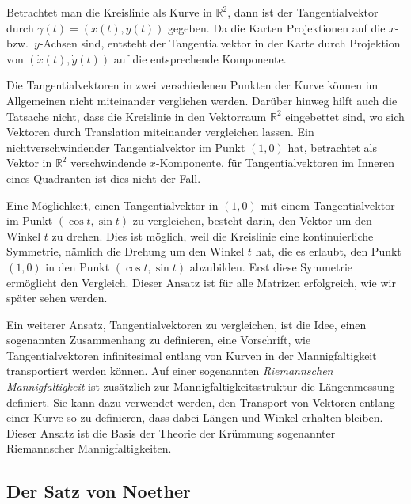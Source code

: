 Betrachtet man die Kreislinie als Kurve in $\mathbb{R}^2$,
dann ist der Tangentialvektor durch
$\dot{\gamma}(t)=(\dot{x}(t),\dot{y}(t))$ gegeben.
Da die Karten Projektionen auf die $x$- bzw.~$y$-Achsen sind,
entsteht der Tangentialvektor in der Karte durch Projektion
von $(\dot{x}(t),\dot{y}(t))$ auf die entsprechende Komponente.

Die Tangentialvektoren in zwei verschiedenen Punkten der Kurve können
im Allgemeinen nicht miteinander verglichen werden.
Darüber hinweg hilft auch die Tatsache nicht, dass die Kreislinie
in den Vektorraum $\mathbb{R}^2$ eingebettet sind, wo sich Vektoren
durch Translation miteinander vergleichen lassen.
Ein nichtverschwindender Tangentialvektor im Punkt $(1,0)$ hat, 
betrachtet als Vektor in $\mathbb{R}^2$ verschwindende $x$-Komponente,
für Tangentialvektoren im Inneren eines Quadranten ist dies nicht
der Fall.

Eine Möglichkeit, einen Tangentialvektor in $(1,0)$ mit einem
Tangentialvektor im Punkt $(\cos t,\sin t)$ zu vergleichen, besteht
darin, den Vektor um den Winkel $t$ zu drehen.
Dies ist möglich, weil die Kreislinie eine kontinuierliche Symmetrie,
nämlich die Drehung um den Winkel $t$ hat, die es erlaubt, den Punkt $(1,0)$
in den Punkt $(\cos t,\sin t)$ abzubilden.
Erst diese Symmetrie ermöglicht den Vergleich.
Dieser Ansatz ist für alle Matrizen erfolgreich, wie wir später sehen werden.

Ein weiterer Ansatz, Tangentialvektoren zu vergleichen, ist die Idee, 
einen sogenannten Zusammenhang zu definieren, eine Vorschrift, wie
Tangentialvektoren infinitesimal entlang von Kurven in der Mannigfaltigkeit
transportiert werden können.
Auf einer sogenannten {\em Riemannschen Mannigfaltigkeit} ist zusätzlich
zur Mannigfaltigkeitsstruktur die Längenmessung definiert.
Sie kann dazu verwendet werden, den Transport von Vektoren entlang einer
Kurve so zu definieren, dass dabei Längen und Winkel erhalten bleiben.
Dieser Ansatz ist die Basis der Theorie der Krümmung sogenannter
Riemannscher Mannigfaltigkeiten.

\subsection{Der Satz von Noether
\label{buch:subsection:noether}}







